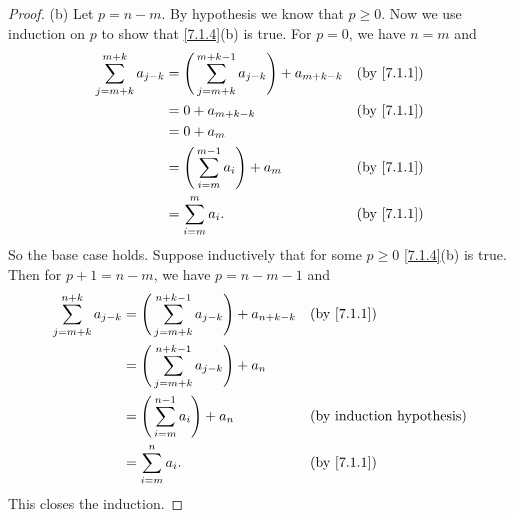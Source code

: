 \begin{proof}{(b)}
  Let \(p = n - m\).
  By hypothesis we know that \(p \geq 0\).
  Now we use induction on \(p\) to show that \cref{7.1.4}(b) is true.
  For \(p = 0\), we have \(n = m\) and
  \begin{align*}
    \sum_{j = m + k}^{m + k} a_{j - k} & = \Bigg(\sum_{j = m + k}^{m + k - 1} a_{j - k}\Bigg) + a_{m + k - k} &  & \text{(by \cref{7.1.1})} \\
                                       & = 0 + a_{m + k - k}                                                  &  & \text{(by \cref{7.1.1})} \\
                                       & = 0 + a_m                                                                                          \\
                                       & = \Bigg(\sum_{i = m}^{m - 1} a_i\Bigg) + a_m                         &  & \text{(by \cref{7.1.1})} \\
                                       & = \sum_{i = m}^m a_i.                                                &  & \text{(by \cref{7.1.1})}
  \end{align*}
  So the base case holds.
  Suppose inductively that for some \(p \geq 0\) \cref{7.1.4}(b) is true.
  Then for \(p + 1 = n - m\), we have \(p = n - m - 1\) and
  \begin{align*}
    \sum_{j = m + k}^{n + k} a_{j - k} & = \Bigg(\sum_{j = m + k}^{n + k - 1} a_{j - k}\Bigg) + a_{n + k - k} &  & \text{(by \cref{7.1.1})}         \\
                                       & = \Bigg(\sum_{j = m + k}^{n + k - 1} a_{j - k}\Bigg) + a_n                                                 \\
                                       & = \Bigg(\sum_{i = m}^{n - 1} a_i\Bigg) + a_n                         &  & \text{(by induction hypothesis)} \\
                                       & = \sum_{i = m}^n a_i.                                                &  & \text{(by \cref{7.1.1})}
  \end{align*}
  This closes the induction.
\end{proof}

